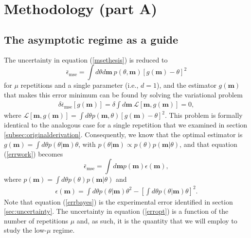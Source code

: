 \section{Methodology (part A)} \label{method}

\subsection{The asymptotic regime as a guide}
\label{theory}

The uncertainty in equation (\ref{msethesis}) is reduced to
\begin{equation}
\bar{\epsilon}_{\mathrm{mse}} = \int d\theta d\boldsymbol{m} ~p(\theta, \boldsymbol{m}) \left[g(\boldsymbol{m}) - \theta \right]^2
\label{errwork}
\end{equation}
for $\mu$ repetitions and a single parameter (i.e., $d = 1$), and the estimator $g(\boldsymbol{m})$ that makes this error minimum can be found by solving the variational problem \cite{jaynes2003} 
\begin{align}
\delta \bar{\epsilon}_{\mathrm{mse}}\left[g(\boldsymbol{m}) \right] = \delta \int d\boldsymbol{m}~ \mathcal{L}\left[\boldsymbol{m},g(\boldsymbol{m})\right]= 0,
\end{align}
where $\mathcal{L}\left[\boldsymbol{m}, g(\boldsymbol{m})\right] = \int d\theta p(\boldsymbol{m},\theta) \left[g(\boldsymbol{m}) - \theta\right]^2$. This problem is formally identical to the analogous case for a single repetition that we examined in section \ref{subsec:originalderivation}. Consequently, we know that the optimal estimator is $g(\boldsymbol{m}) = \int d\theta p(\theta|\boldsymbol{m})\theta$, with $p(\theta|\boldsymbol{m}) \propto p(\theta)p(\boldsymbol{m}|\theta)$, and that equation (\ref{errwork}) becomes 
\begin{equation}
\bar{\epsilon}_{\mathrm{mse}} = \int d\boldsymbol{m} p(\boldsymbol{m})\epsilon(\boldsymbol{m}),
\label{erropt}
\end{equation}
where $p(\boldsymbol{m}) = \int d\theta p(\theta)p(\boldsymbol{m}|\theta)$ and  
\begin{align}
\epsilon(\boldsymbol{m}) = \int d\theta p(\theta|\boldsymbol{m}) \theta^2- \left[\int d\theta p(\theta|\boldsymbol{m}) \theta \right]^2.
\label{errbayes}
\end{align}
Note that equation (\ref{errbayes}) is the experimental error identified in section \ref{sec:uncertainty}. The uncertainty in equation (\ref{erropt}) is a function of the number of repetitions $\mu$ and, as such, it is the quantity that we will employ to study the low-$\mu$ regime.

